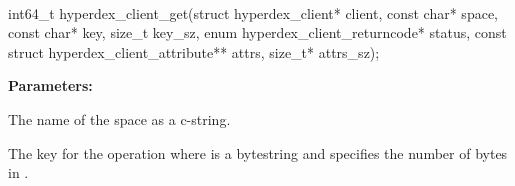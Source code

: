 %
%
%


\paragraph{}
\label{api:c:get}
\begin{ccode}
int64_t hyperdex_client_get(struct hyperdex_client* client,
        const char* space,
        const char* key, size_t key_sz,
        enum hyperdex_client_returncode* status,
        const struct hyperdex_client_attribute** attrs, size_t* attrs_sz);
\end{ccode}
\funcdesc 

\noindent\textbf{Parameters:}
\begin{description}[labelindent=\widthof{{\code{key}, \code{key\_sz}}},leftmargin=*,noitemsep,nolistsep,align=right]
\item[\code{space}] The name of the space as a c-string.
\item[\code{key}, \code{key\_sz}] The key for the operation where  is a bytestring and  specifies the number of bytes in .
\end{description}


